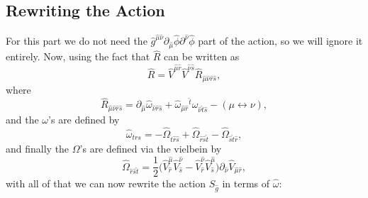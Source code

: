 \documentclass{article}
\begin{document}
\subsection{Rewriting the Action}
For this part we do not need the $\hat g^{\hat \mu \hat \nu}\partial_{\hat \mu}\hat \phi \partial^{\hat \nu}\hat \phi$ part of the action, so we will ignore it entirely.
Now, using the fact that $\hat R$ can be written as
\begin{equation*} \label{Ricciexp}
    \hat R = \hat V^{\hat \mu \hat r} \hat V^{\hat \nu \hat s} \hat R_{\hat \mu \hat \nu \hat r \hat s},
\end{equation*}
where 
\begin{equation*} \label{expriemann}
    \hat R_{\hat \mu \hat \nu \hat r \hat s} =  \partial_{\hat \mu } \hat \omega_{\hat \nu \hat r \hat s}+ \hat \omega_{\hat\mu \hat r}{}^{\hat t}\omega_{\hat\nu \hat t \hat s} - (\mu \leftrightarrow \nu),
\end{equation*}
and the $\omega$'s are defined by
\begin{equation} \label{expomega}
    \hat \omega_{trs } = - \hat\Omega_{\hat t\hat r \hat s} +\hat\Omega_{\hat r\hat s \hat t } -\hat\Omega_{\hat s\hat t \hat r},
\end{equation}
and finally the $\Omega$'s are defined via the vielbein by
\begin{equation}\label{expOmega}
    \hat\Omega_{\hat r\hat s \hat t } = \frac{1}{2}\big(\hat V^{\hat \mu}_{\hat r}\hat V^{\hat \nu}_{\hat s} -\hat V^{\hat \nu}_{\hat r} \hat V^{\hat \mu}_{\hat s}\big)\partial_{\hat \nu} \hat V_{\hat \mu \hat r},
\end{equation}
with all of that we can now rewrite the action $S_{\hat g}$ in terms of $\hat \omega$:
\end{document}
